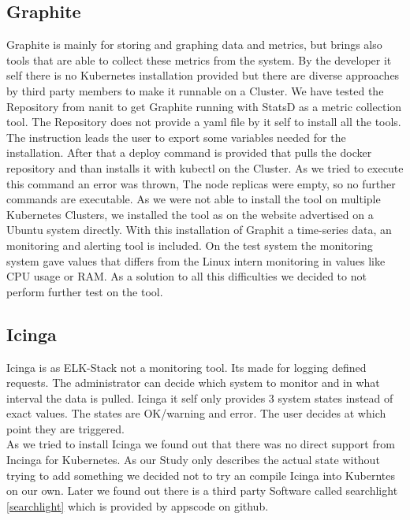 \subsection{Graphite}
Graphite is mainly for storing and graphing data and metrics, but brings also tools that are able to collect these metrics from the system. By the developer it self there is no Kubernetes installation provided but there are diverse approaches by third party members to make it runnable on a Cluster. We have tested the Repository from nanit \cite{graphite} to get Graphite running with StatsD \cite{statsd} as a metric collection tool. The Repository does not provide a yaml file by it self to install all the tools. The instruction leads the user to export some variables needed for the installation. After that a deploy command is provided that pulls the docker repository and than installs it with kubectl on the Cluster. As we tried to execute this command an error was thrown, The node replicas were empty, so no further commands are executable. As we were not able to install the tool on multiple Kubernetes Clusters, we installed the tool as on the website advertised on a Ubuntu system directly. With this installation of Graphit a time-series data, an monitoring and alerting tool is included. On the test system the monitoring system gave values that differs from the Linux intern monitoring in values like CPU usage or RAM. As a solution to all this difficulties we decided to not perform further test on the tool.

\subsection{Icinga}
\label{Icinga}
Icinga is as ELK-Stack not a monitoring tool. Its made for logging defined requests. The administrator can decide which system to monitor and in what interval the data is pulled.
Icinga it self only provides 3 system states instead of exact values. The states are OK/warning and error. The user decides at which point they are triggered.\\
As we tried to install Icinga we found out that there was no direct support from Incinga for Kubernetes. As our Study only describes the actual state without trying to add something we decided not to try an compile Icinga into Kuberntes on our own. Later we found out there is a third party Software called searchlight \ref{searchlight} which is provided by appscode on github.
 